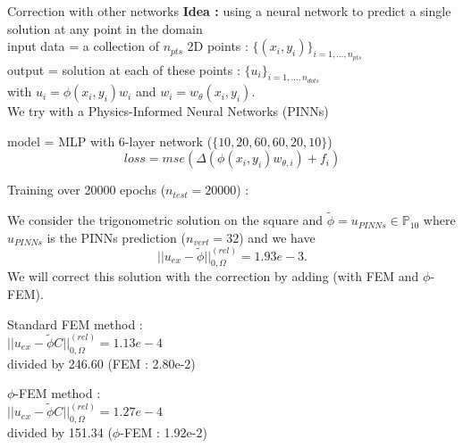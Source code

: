 \documentclass[compress,10pt,xcolor={table,dvipsnames},t]{beamer}
\begin{document}
	\begin{frame}[allowframebreaks]{Correction with other networks}
		\textbf{Idea :} using a neural network to predict a single solution at any point in the domain \\
		\quad input data = a collection of $n_{pts}$ 2D points : $\{(x_i,y_i)\}_{i=1,\dots, n_{pts}}$ \\
		\quad output = solution at each of these points : $\{u_i\}_{i=1,\dots,n_{dots}}$ \\
		\quad \quad with $u_i=\phi(x_i,y_i)w_i$ and $w_i=w_\theta(x_i,y_i)$. \\
		
		We try with a Physics-Informed Neural Networks (PINNs)
		
		\begin{minipage}{0.48\linewidth}
			model = MLP with 6-layer network ($\{10,20,60,60,20,10\}$)
			\centering
			$$loss = mse(\Delta (\phi(x_i,y_i)w_{\theta,i})+f_i)$$
		\end{minipage}
		\begin{minipage}{0.48\linewidth}
			Training over 20000 epochs ($n_{test}=20000$) :
			\centering
		\end{minipage}
		
		\newpage
		
		We consider the trigonometric solution on the square and $\tilde{\phi}=u_{PINNs}\in\mathbb{P}_{10}$ where $u_{PINNs}$ is the PINNs prediction ($n_{vert}=32$) and we have 
		\begin{equation*}
			||u_{ex}-\tilde{\phi}||_{0,\Omega}^{(rel)}=1.93e-3.
		\end{equation*}
		We will correct this solution with the correction by adding (with FEM and $\phi$-FEM).
		
		\begin{minipage}{0.48\linewidth}
			Standard FEM method :
			\centering
			 \\
			$||u_{ex}-\tilde{\phi}C||_{0,\Omega}^{(rel)}=1.13e-4$ \\
			divided by 246.60 (FEM : 2.80e-2)
		\end{minipage}
		\begin{minipage}{0.48\linewidth}
			$\phi$-FEM method :
			\centering
			 \\
			$||u_{ex}-\tilde{\phi}C||_{0,\Omega}^{(rel)}=1.27e-4$ \\
			divided by 151.34 ($\phi$-FEM : 1.92e-2)
		\end{minipage}
		
	\end{frame}
	
\end{document}
